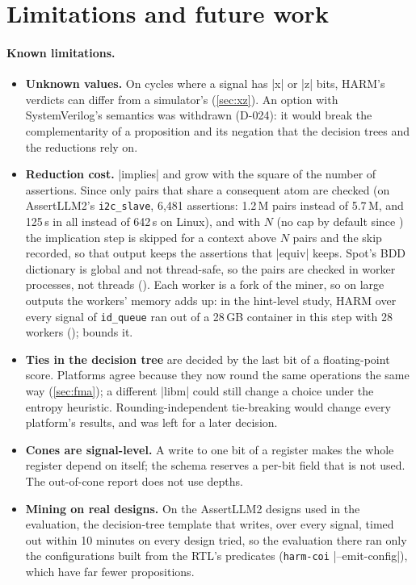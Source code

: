 \section{Limitations and future work}\label{sec:limits}

\paragraph{Known limitations.}
\begin{itemize}
\item \textbf{Unknown values.} On cycles where a signal has \code|x| or \code|z| bits, HARM's verdicts can differ from a simulator's (\cref{sec:xz}). An option with SystemVerilog's semantics was withdrawn (D-024): it would break the complementarity of a proposition and its negation that the decision trees and the reductions rely on.
\item \textbf{Reduction cost.}  \code|implies| and  grow with the square of the number of assertions. Since  only pairs that share a consequent atom are checked (on AssertLLM2's \texttt{i2c\_slave}, 6{,}481 assertions: 1.2\,M pairs instead of 5.7\,M, and 125\,s in all instead of 642\,s on Linux), and with  $N$ (no cap by default since ) the implication step is skipped for a context above $N$ pairs and the skip recorded, so that output keeps the assertions that \code|equiv| keeps. Spot's BDD dictionary is global and not thread-safe, so the pairs are checked in worker processes, not threads (). Each worker is a fork of the miner, so on large outputs the workers' memory adds up: in the hint-level study, HARM over every signal of \texttt{id\_queue} ran out of a 28\,GB container in this step with 28 workers ();  bounds it.
\item \textbf{Ties in the decision tree} are decided by the last bit of a floating-point score. Platforms agree because they now round the same operations the same way (\cref{sec:fma}); a different \code|libm| could still change a choice under the entropy heuristic. Rounding-independent tie-breaking would change every platform's results, and was left for a later decision.
\item \textbf{Cones are signal-level.} A write to one bit of a register makes the whole register depend on itself; the schema reserves a per-bit field that is not used. The out-of-cone report does not use depths.
\item \textbf{Mining on real designs.} On the AssertLLM2 designs used in the evaluation, the decision-tree template that  writes, over every signal, timed out within 10 minutes on every design tried, so the evaluation there ran only the configurations built from the RTL's predicates (\texttt{harm-coi} \code|--emit-config|), which have far fewer propositions.

\end{itemize}
